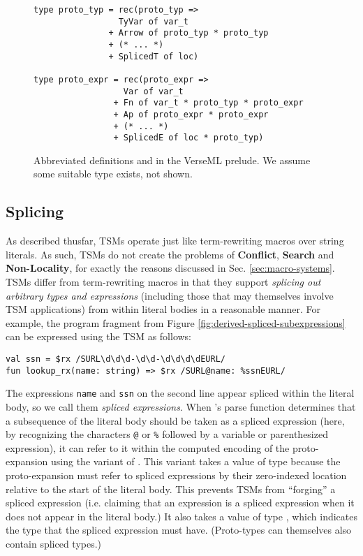 \begin{figure}
\begin{lstlisting}[numbers=none]
type proto_typ = rec(proto_typ => 
                 TyVar of var_t 
               + Arrow of proto_typ * proto_typ 
               + (* ... *) 
               + SplicedT of loc)

type proto_expr = rec(proto_expr => 
                  Var of var_t 
                + Fn of var_t * proto_typ * proto_expr
                + Ap of proto_expr * proto_expr
                + (* ... *) 
                + SplicedE of loc * proto_typ)
\end{lstlisting}
\caption[Abbreviated definitions of  and  in VerseML]{Abbreviated definitions  and  in the VerseML prelude. We assume some suitable type  exists, not shown.}
\label{fig:candidate-exp-verseml}
\end{figure}


\subsection{Splicing}\label{sec:splicing-and-hygiene}
As described thusfar, TSMs operate just like term-rewriting macros over string literals. As such, TSMs do not create the problems of \textbf{Conflict}, \textbf{Search} and \textbf{Non-Locality}, for exactly the reasons discussed in Sec. \ref{sec:macro-systems}. TSMs differ from term-rewriting macros in that they support \emph{splicing out arbitrary types and expressions} (including those that may themselves involve TSM applications) from within literal bodies in a reasonable manner. For example, the program fragment from Figure \ref{fig:derived-spliced-subexpressions} can be expressed using the  TSM as follows:
\begin{lstlisting}[numbers=none]
val ssn = $rx /SURL\d\d\d-\d\d-\d\d\d\dEURL/ 
fun lookup_rx(name: string) => $rx /SURL@name: %ssnEURL/ 
\end{lstlisting}
The expressions \lstinline{name} and \lstinline{ssn} on the second line appear spliced within the literal body, so we call them \emph{spliced expressions}. When 's parse function determines that a subsequence of the literal body should be taken as a spliced expression (here, by recognizing the characters \lstinline{@} or \lstinline{%} followed by a variable or parenthesized expression), 
it can refer to it within the computed encoding of the proto-expansion using the  variant of . 
This variant takes a value of type  because the proto-expansion must refer to spliced expressions by their zero-indexed location relative to the start of the literal body. This prevents TSMs from ``forging'' a spliced expression (i.e. claiming that an expression is a spliced expression when it does not appear in the literal body.) It also takes a value of type , which indicates the type that the spliced expression must have. (Proto-types can themselves also contain spliced types.)

